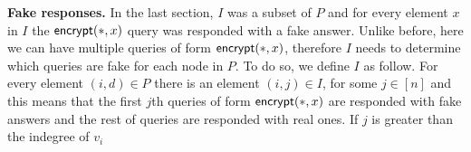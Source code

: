 \documentclass{article}
\newcommand{\encrypt}{{\sf encrypt}}
\begin{document}
\noindent \textbf{Fake responses.} In the last section, $I$ was a subset of $P$ and for every element $x$ in $I$ the $\encrypt(*,x)$ query was responded with a fake answer. Unlike before, here we can have multiple queries of form $\encrypt(*,x)$, therefore $I$ needs to determine which queries are fake for each node in $P$. To do so, we define $I$ as follow. For every element $(i,d)\in P$ there is an element $(i,j)\in I$, for some $j\in [n]$ and this means that the first $j$th queries of form $\encrypt(*,x)$ are responded with fake answers and the rest of queries are responded with real ones. If $j$ is greater than the indegree of $v_i$
\end{document}
